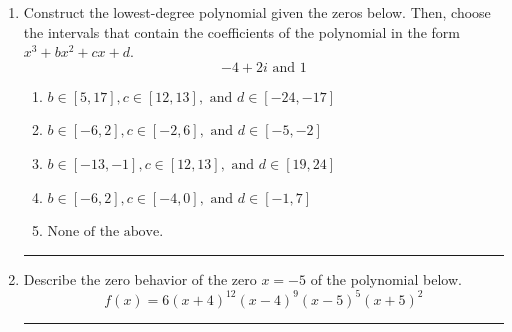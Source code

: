 \documentclass[14pt]{extbook}
\newcommand{\litem}[1]{\item#1\hspace*{-1cm}\rule{\textwidth}{0.4pt}}
\begin{document}
\begin{enumerate}
\litem{
Construct the lowest-degree polynomial given the zeros below. Then, choose the intervals that contain the coefficients of the polynomial in the form $x^3+bx^2+cx+d$.\[ -4 + 2 i \text{ and } 1 \]\begin{enumerate}[label=\Alph*.]
\item \( b \in [5, 17], c \in [12, 13], \text{ and } d \in [-24, -17] \)
\item \( b \in [-6, 2], c \in [-2, 6], \text{ and } d \in [-5, -2] \)
\item \( b \in [-13, -1], c \in [12, 13], \text{ and } d \in [19, 24] \)
\item \( b \in [-6, 2], c \in [-4, 0], \text{ and } d \in [-1, 7] \)
\item \( \text{None of the above.} \)

\end{enumerate} }
\litem{
Describe the zero behavior of the zero $x = -5$ of the polynomial below.\[ f(x) = 6(x + 4)^{12}(x - 4)^{9}(x - 5)^{5}(x + 5)^{2} \]\begin{enumerate}[label=\Alph*.]

\end{enumerate}}
\end{enumerate}
\end{document}
